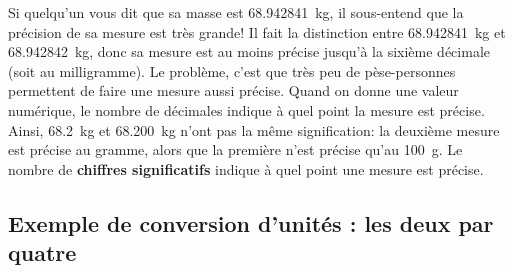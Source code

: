 Si quelqu'un vous dit que sa masse est \SI{68.942841}{\kilogram}, il
sous-entend que la précision de sa mesure est très grande!  Il fait la
distinction entre \SI{68.942841}{\kilogram} et \SI{68.942842}{\kilogram}, donc
sa mesure est au moins précise jusqu'à la sixième décimale (soit au
milligramme).  Le problème, c'est que très peu de pèse-personnes permettent de
faire une mesure aussi précise.  
Quand on donne une valeur numérique, le nombre
de décimales indique à quel point la mesure est précise.  Ainsi,
\SI{68.2}{\kilogram} et \SI{68.200}{\kilogram} n'ont pas la même signification:
la deuxième mesure est précise au gramme, alors que la première n'est précise
qu'au \SI{100}{\gram}.  Le nombre de \textbf{chiffres significatifs} indique à
quel point une mesure est précise.


\subsection{Exemple de conversion d'unités : les deux par quatre}

